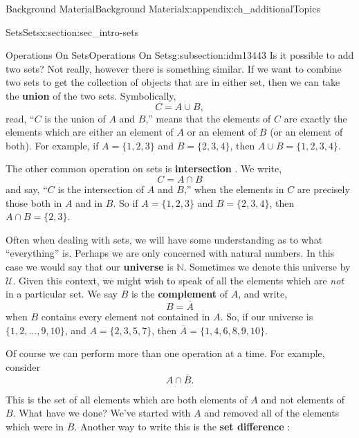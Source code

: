 \documentclass[oneside,10pt,]{book}
\newcommand{\terminology}[1]{\textbf{#1}}
\numberwithin{equation}{chapter}
\def\N{\mathbb N}
\def\U{\mathcal U}
\begin{document}
\begin{appendixptx}{Background Material}{}{Background Material}{}{}{x:appendix:ch_additionalTopics}
\begin{sectionptx}{Sets}{}{Sets}{}{}{x:section:sec_intro-sets}
%
%
\typeout{************************************************}
\typeout{************************************************}
%
\begin{subsectionptx}{Operations On Sets}{}{Operations On Sets}{}{}{g:subsection:idm13443}
Is it possible to add two sets? Not really, however there is something similar. If we want to combine two sets to get the collection of objects that are in either set, then we can take the \terminology{union}  of the two sets. Symbolically,%
\begin{equation*}
C = A \cup B,
\end{equation*}
read, ``\(C\) is the union of \(A\) and \(B\),'' means that the elements of \(C\) are exactly the elements which are either an element of \(A\) or an element of \(B\) (or an element of both). For example, if \(A = \{1, 2, 3\}\) and \(B = \{2, 3, 4\}\), then \(A \cup B = \{1, 2, 3, 4\}\).%
\par
The other common operation on sets is \terminology{intersection} . We write,%
\begin{equation*}
C = A \cap B
\end{equation*}
and say, ``\(C\) is the intersection of \(A\) and \(B\),'' when the elements in \(C\) are precisely those both in \(A\) and in \(B\). So if \(A = \{1, 2, 3\}\) and \(B = \{2, 3, 4\}\), then \(A \cap B = \{2, 3\}\).%
\par
Often when dealing with sets, we will have some understanding as to what ``everything'' is. Perhaps we are only concerned with natural numbers. In this case we would say that our \terminology{universe} is \(\N\). Sometimes we denote this universe by \(\U\). Given this context, we might wish to speak of all the elements which are \emph{not} in a particular set. We say \(B\) is the \terminology{complement}  of \(A\), and write,%
\begin{equation*}
B = \overline A
\end{equation*}
when \(B\) contains every element not contained in \(A\). So, if our universe is \(\{1, 2,\ldots, 9, 10\}\), and \(A = \{2, 3, 5, 7\}\), then \(\overline A = \{1, 4, 6, 8, 9,10\}\).%
\par
Of course we can perform more than one operation at a time. For example, consider%
\begin{equation*}
A \cap \overline B.
\end{equation*}
%
\par
This is the set of all elements which are both elements of \(A\) and not elements of \(B\). What have we done? We've started with \(A\) and removed all of the elements which were in \(B\). Another way to write this is the \terminology{set difference}  :%

\end{subsectionptx}
\end{sectionptx}
\end{appendixptx}
\end{document}
